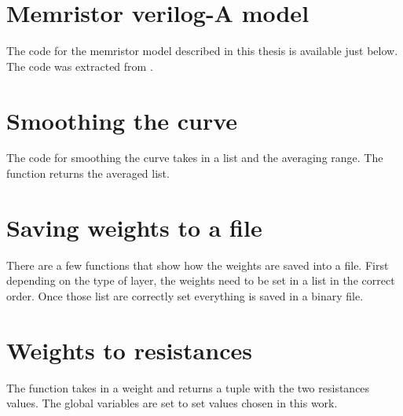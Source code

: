 \label{ap:codes}
\pythonstyle

\section{Memristor verilog-A model}\label{apsec:memModel}

The code for the memristor model described in this thesis is available just below. The code was extracted from \cite{memCadenceModel}.



\section{Smoothing the curve}\label{apsec:smoothFunc}

The code for smoothing the curve takes in a list and the averaging range. The function returns the averaged list.



\section{Saving weights to a file}\label{apsec:saveWei}

There are a few functions that show how the weights are saved into a file.
First depending on the type of layer, the weights need to be set in a list in the correct order.
Once those list are correctly set everything is saved in a binary file.



\section{Weights to resistances}\label{apsec:wei2res}

The function takes in a weight and returns a tuple with the two resistances values. The global variables are set to set values chosen in this work.


